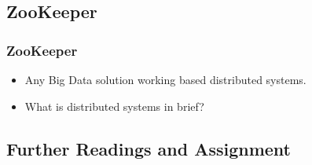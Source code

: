 
\subsection{ZooKeeper}
\begin{frame}
\frametitle{ZooKeeper}
\begin{itemize} 
	\item Any Big Data solution working based distributed systems.
	\item What is distributed systems in brief?
\end{itemize}
\end{frame}

\subsection{Further Readings and Assignment}



